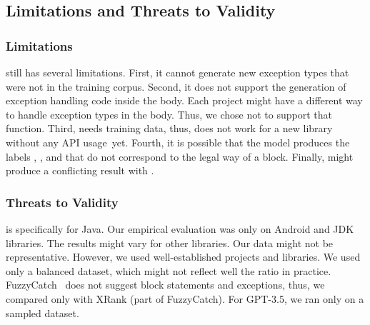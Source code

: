 
\subsection{\bf Limitations and Threats to Validity}

\subsubsection{Limitations}

{\tool} still has several limitations.
First, it cannot generate new exception types that were not in
the training corpus. Second, it does not support the generation of
exception handling code inside the  body. Each
project might have a different way to handle exception types in
the  body. Thus, we chose not to support that function.
Third, {\tool} needs training data, thus, does not work for a new
library without any API usage~yet. Fourth, it is possible that the
model produces the labels , , and 
that do not correspond to the legal way of a 
block. Finally, {\xblock} might produce a conflicting result with
{\xstate}.

\subsubsection{Threats to Validity}

{\tool} is specifically for Java. Our empirical evaluation was only on
Android and JDK libraries. The results might vary for other
libraries. Our data might not be representative. However, we
used well-established projects and libraries.  We used only a balanced
dataset, which might not reflect well the ratio in practice.
FuzzyCatch~\cite{xrank-fse20} does not suggest  block
statements and exceptions, thus, we compared only with XRank (part of
FuzzyCatch). For GPT-3.5, we ran only on a sampled dataset.
